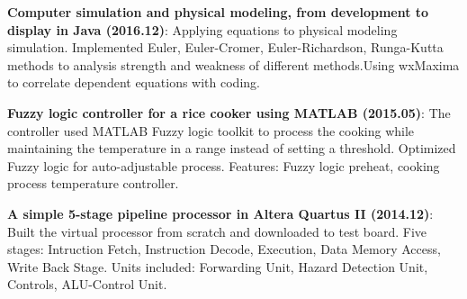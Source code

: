 \documentclass[letterpaper,11pt]{article}
\newcommand{\resumeItem}[2]{
  \item\small{
    \textbf{#1}{: #2 \vspace{-2pt}}
  }
}
\newcommand{\resumeSubItem}[2]{\resumeItem{#1}{#2}\vspace{-4pt}}
\begin{document}
    \resumeSubItem{Computer simulation and physical modeling, from development to display in Java (2016.12)}
    {Applying equations to physical modeling simulation. Implemented Euler, Euler-Cromer, Euler-Richardson, Runga-Kutta methods to analysis strength and weakness of different methods.Using wxMaxima to correlate dependent equations with coding.}
    
    
    \resumeSubItem{Fuzzy logic controller for a rice cooker using MATLAB (2015.05)}
    {The controller used MATLAB Fuzzy logic toolkit to process the cooking while maintaining the temperature in a range instead of setting a threshold. Optimized Fuzzy logic for auto-adjustable process. Features: Fuzzy logic preheat, cooking process temperature controller.}
    
    \resumeSubItem{A simple 5-stage pipeline processor in Altera Quartus II (2014.12)}
    {Built the virtual processor from scratch and downloaded to test board. Five stages: Intruction Fetch, Instruction Decode, Execution, Data Memory Access, Write Back Stage. Units included: Forwarding Unit, Hazard Detection Unit, Controls, ALU-Control Unit.}
    
\end{document}

